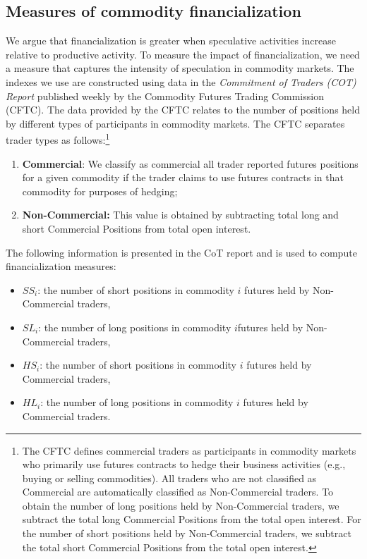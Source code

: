\documentclass[12pt]{article}
\begin{document}
\subsection{Measures of commodity financialization}
We argue that financialization is greater when speculative activities increase relative to productive activity. To measure the impact of financialization, we need a measure that captures the intensity of speculation in commodity markets. The indexes we use are constructed using data in the \emph{Commitment of Traders (COT) Report} published weekly by the Commodity Futures Trading Commission (CFTC).  The data provided by the CFTC relates to the number of positions held by different types of participants in commodity markets. The CFTC separates trader types as follows:\footnote{The CFTC defines commercial traders as participants in commodity markets who primarily use futures contracts to hedge their business activities (e.g., buying or selling commodities). All traders who are not classified as Commercial are automatically classified as Non-Commercial traders. To obtain the number of long positions held by Non-Commercial traders, we subtract the total long Commercial Positions from the total open interest. For the number of short positions held by Non-Commercial traders, we subtract the total short Commercial Positions from the total open interest.}

\begin{enumerate}
\item \textbf{Commercial}: We classify as commercial all trader reported futures positions for a given commodity if the trader claims to use futures contracts in that commodity for purposes of hedging;
\item \textbf{Non-Commercial:} This value is obtained by subtracting total long and short Commercial Positions from  total open interest.
\end{enumerate}
  
The following information is presented in the CoT report and is used to compute financialization measures:

\begin{itemize}
\item $SS_i$: the number of short positions in commodity $i$ futures held by Non-Commercial traders,
\item $SL_i$: the number of long positions in commodity $i$futures held by Non-Commercial traders,
\item $HS_i$: the number of short positions in commodity $i$ futures held by Commercial traders, 
\item $HL_i$: the number of long positions in commodity $i$ futures held by Commercial traders.
\end{itemize}
\end{document}
